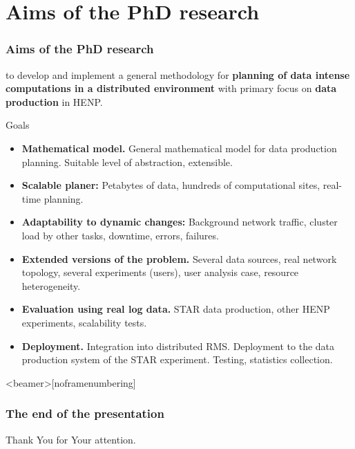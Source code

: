 \documentclass{beamer}
\begin{document}
\section{Aims of the PhD research}
\begin{frame}\frametitle{Aims of the PhD research}
\begin{footnotesize}
to develop and implement a general methodology for \textbf{planning of data intense computations in a distributed environment} with primary focus on \textbf{data production} in HENP. 
\begin{block}{Goals}
\begin{itemize}
\item \textbf{Mathematical model.} General mathematical model for data production planning. Suitable level of abstraction, extensible. 
\item \textbf{Scalable planer:} Petabytes of data, hundreds of computational sites, real-time planning.
\item \textbf{Adaptability to dynamic changes:} Background network traffic, cluster load by other tasks, downtime, errors, failures.
\item \textbf{Extended versions of the problem.} Several data sources, real network topology, several experiments (users), user analysis case, resource heterogeneity. 
\item \textbf{Evaluation using real log data.} STAR data production, other HENP experiments, scalability tests. 
\item \textbf{Deployment.} Integration into distributed RMS. Deployment to the data production system of the STAR experiment. Testing, statistics collection. 
\end{itemize}
\end{block}
\end{footnotesize}
\end{frame}

\begin{frame}<beamer>[noframenumbering]\frametitle{The end of the presentation}
\begin{center}
Thank You for Your attention.
\end{center}
\end{frame}
\end{document}
